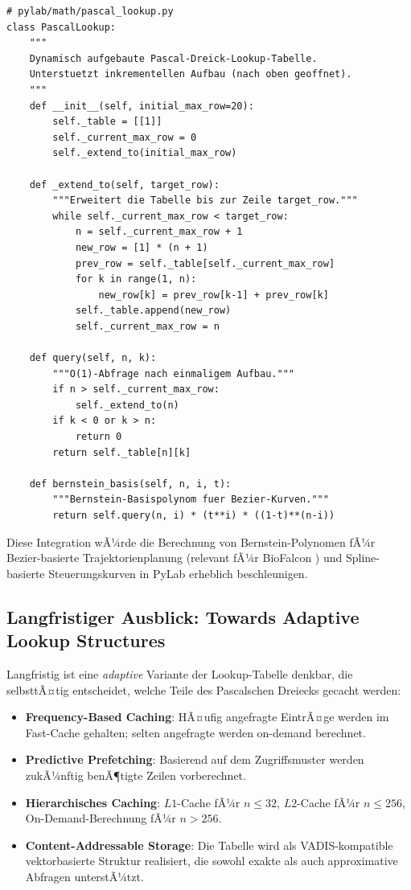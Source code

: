 ﻿\documentclass[12pt, a4paper]{article}
\theoremstyle{plain}
\theoremstyle{definition}
\theoremstyle{remark}
\begin{document}
\begin{lstlisting}[caption={Geplante PyLab-Integration: Pascal-Lookup-Modul},
                   label={lst:pylab_integration}]
# pylab/math/pascal_lookup.py
class PascalLookup:
    """
    Dynamisch aufgebaute Pascal-Dreick-Lookup-Tabelle.
    Unterstuetzt inkrementellen Aufbau (nach oben geoffnet).
    """
    def __init__(self, initial_max_row=20):
        self._table = [[1]]
        self._current_max_row = 0
        self._extend_to(initial_max_row)

    def _extend_to(self, target_row):
        """Erweitert die Tabelle bis zur Zeile target_row."""
        while self._current_max_row < target_row:
            n = self._current_max_row + 1
            new_row = [1] * (n + 1)
            prev_row = self._table[self._current_max_row]
            for k in range(1, n):
                new_row[k] = prev_row[k-1] + prev_row[k]
            self._table.append(new_row)
            self._current_max_row = n

    def query(self, n, k):
        """O(1)-Abfrage nach einmaligem Aufbau."""
        if n > self._current_max_row:
            self._extend_to(n)
        if k < 0 or k > n:
            return 0
        return self._table[n][k]

    def bernstein_basis(self, n, i, t):
        """Bernstein-Basispolynom fuer Bezier-Kurven."""
        return self.query(n, i) * (t**i) * ((1-t)**(n-i))
\end{lstlisting}

Diese Integration wÃ¼rde die Berechnung von Bernstein-Polynomen fÃ¼r
Bezier-basierte Trajektorienplanung (relevant fÃ¼r BioFalcon
\cite{epp2026biofalcon}) und Spline-basierte Steuerungskurven in PyLab
erheblich beschleunigen.

\subsection{Langfristiger Ausblick: Towards Adaptive Lookup Structures}

Langfristig ist eine \emph{adaptive} Variante der Lookup-Tabelle
denkbar, die selbsttÃ¤tig entscheidet, welche Teile des Pascalschen
Dreiecks gecacht werden:

\begin{itemize}
  \item \textbf{Frequency-Based Caching}: HÃ¤ufig angefragte EintrÃ¤ge
        werden im Fast-Cache gehalten; selten angefragte werden on-demand
        berechnet.
  \item \textbf{Predictive Prefetching}: Basierend auf dem
        Zugriffsmuster werden zukÃ¼nftig benÃ¶tigte Zeilen vorberechnet.
  \item \textbf{Hierarchisches Caching}: $L1$-Cache fÃ¼r $n \le 32$,
        $L2$-Cache fÃ¼r $n \le 256$, On-Demand-Berechnung fÃ¼r $n > 256$.
  \item \textbf{Content-Addressable Storage}: Die Tabelle wird als
        VADIS-kompatible \cite{epp2026vadis} vektorbasierte Struktur
        realisiert, die sowohl exakte als auch approximative Abfragen
        unterstÃ¼tzt.
\end{itemize}
\end{document}
